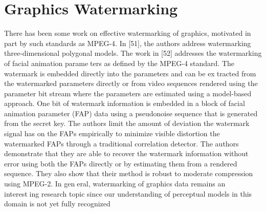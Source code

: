 \documentclass[12pt]{IEeetran}
\begin{document}
\section{Graphics Watermarking}
 There has been some work on effective watermarking of
graphics, motivated in part by such standards as
MPEG-4. In [51], the authors address watermarking
three-dimensional polygonal models. The work in [52]
addresses the watermarking of facial animation parame￾ters as defined by the MPEG-4 standard. The watermark
is embedded directly into the parameters and can be ex￾tracted from the watermarked parameters directly or
from video sequences rendered using the parameter bit
stream where the parameters are estimated using a
model-based approach. One bit of watermark information is embedded in a block of facial animation parameter
(FAP) data using a pseudonoise sequence that is generated from the secret key. The authors limit the amount of
deviation the watermark signal has on the FAPs empirically to minimize visible distortion the watermarked FAPs through a traditional correlation detector. The authors demonstrate that they are able to recover the watermark information without error using both the FAPs directly or by estimating them from a
rendered sequence. They also show that their method is
robust to moderate compression using MPEG-2. In gen￾eral, watermarking of graphics data remains an interest￾ing research topic since our understanding of perceptual
models in this domain is not yet fully recognized
\end{document}
